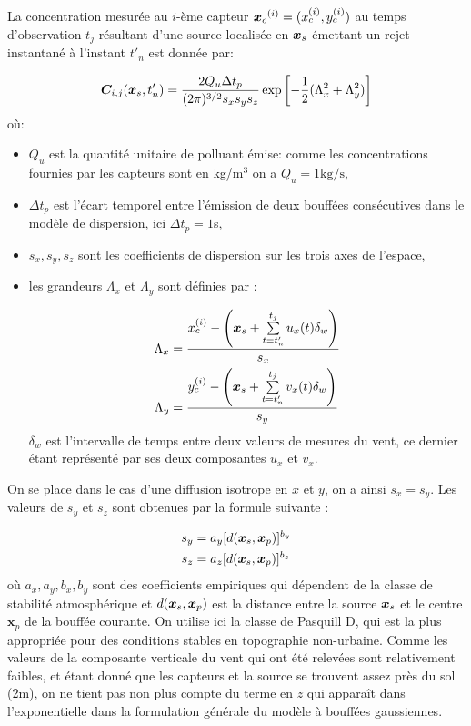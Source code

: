 { La concentration mesurée au $i$-ème capteur ${\bm{x}_c}^{(i)} = (x_c^{(i)}, y_c^{(i)})$ au temps d'observation $t_j$ résultant d'une source localisée en ${\bm{x}_s}$ émettant un rejet instantané à l'instant $t'_n$ est donnée par: 
 
 \begin{equation}
 {\bm{C}}_{i,j}({\bm{x}_s}, t'_n) = \dfrac{2Q_u\Delta t_p}{(2\pi)^{3/2}s_x s_y s_z}\exp\left[-\dfrac{1}{2}(\Lambda_x^2 + \Lambda_y^2)\right]
 \label{eq_AE_27}
 \end{equation}
 où:
 \begin{itemize}
 	\item $Q_u$ est la quantité unitaire de polluant émise: comme les concentrations fournies par les capteurs sont en kg/m$^3$ on a $Q_u = 1\text{kg/s}$,
 	\item $\Delta t_p$ est l'écart temporel entre l'émission de deux bouffées consécutives dans le modèle de dispersion, ici $\Delta t_p = 1$s,
 	\item $s_x, s_y, s_z$ sont les coefficients de dispersion sur les trois axes de l'espace,
 	\item les grandeurs $\Lambda_x$ et $\Lambda_y$ sont définies par : 
 	
 	\begin{equation}
 	\begin{split}
 	\Lambda_x &= \dfrac{x_c^{(i)} - \left({\bm{x}_s} + \sum\limits_{t=t'_n}^{t_j}u_x(t)\delta_w\right)}{s_x}\\
 	 	\Lambda_y &= \dfrac{y_c^{(i)} - \left({\bm{x}_s} + \sum\limits_{t=t'_n}^{t_j}v_x(t)\delta_w\right)}{s_y}
 	\end{split}
 	\end{equation}
 	$\delta_w$ est l'intervalle de temps entre deux valeurs de mesures du vent, ce dernier étant représenté par ses deux composantes $u_x$ et $v_x$.
 \end{itemize}
 
 On se place dans le cas d'une diffusion isotrope en $x$ et $y$, on a ainsi $s_x = s_y$. Les valeurs de $s_y$ et $s_z$ sont obtenues par la formule suivante : 
 
 \begin{equation}
 \begin{split}
 s_y &= a_y [d({\bm{x}_s}, \bm{x}_p)]^{b_y}\\
 s_z &= a_z [d({\bm{x}_s}, \bm{x}_p)]^{b_z}
 \end{split}
 \end{equation}
 où $a_x, a_y, b_x, b_y$ sont des coefficients empiriques qui dépendent de la classe de stabilité atmosphérique \cite{Pasquill1983} et $d({\bm{x}_s}, \bm{x}_p)$ est la distance entre la source ${\bm{x}_s}$ et le centre $\bm{x}_p$ de la bouffée courante. On utilise ici la classe de Pasquill D, qui est la plus appropriée pour des conditions stables en topographie non-urbaine. 
 Comme les valeurs de la composante verticale du vent qui ont été relevées sont relativement faibles, et étant donné que les capteurs et la source se trouvent assez près du sol (2m), on ne tient pas non plus compte du terme en $z$ qui apparaît dans l'exponentielle dans la formulation générale du modèle {à bouffées gaussiennes}.

}
